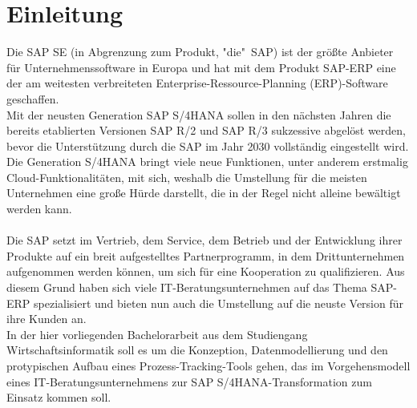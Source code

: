 \section{Einleitung}
Die SAP SE (in Abgrenzung zum Produkt, "die"\ SAP) ist der größte Anbieter für Unternehmenssoftware in Europa und hat mit dem Produkt SAP-ERP eine der am weitesten verbreiteten Enterprise-Ressource-Planning (ERP)-Software geschaffen. \\Mit der neusten Generation SAP S/4HANA sollen in den nächsten Jahren die bereits etablierten Versionen SAP R/2 und SAP R/3 sukzessive abgelöst werden, bevor die Unterstützung durch die SAP im Jahr 2030 vollständig eingestellt wird. Die Generation S/4HANA bringt viele neue Funktionen, unter anderem erstmalig Cloud-Funktionalitäten, mit sich, weshalb die Umstellung für die meisten Unternehmen eine große Hürde darstellt, die in der Regel nicht alleine bewältigt werden kann. \\\\
Die SAP setzt im Vertrieb, dem Service, dem Betrieb und der Entwicklung ihrer Produkte auf ein breit aufgestelltes Partnerprogramm, in dem Drittunternehmen aufgenommen werden können, um sich für eine Kooperation zu qualifizieren. Aus diesem Grund haben sich viele IT-Beratungsunternehmen auf das Thema SAP-ERP spezialisiert und bieten nun auch die Umstellung auf die neuste Version für ihre Kunden an.\\
In der hier vorliegenden Bachelorarbeit aus dem Studiengang Wirtschaftsinformatik soll es um die Konzeption, Datenmodellierung und den protypischen Aufbau eines Prozess-Tracking-Tools gehen, das im Vorgehensmodell eines IT-Beratungsunternehmens zur SAP S/4HANA-Transformation zum Einsatz kommen soll.
